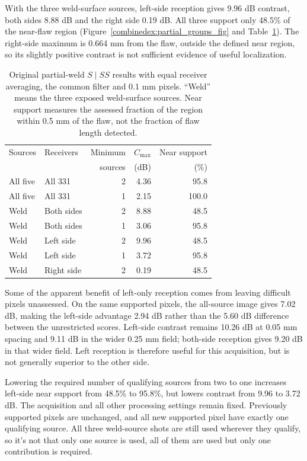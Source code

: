 With the three weld-surface sources, left-side reception gives 9.96 dB contrast, both sides 8.88 dB and the right side 0.19 dB. All three support only 48.5\% of the near-flaw region (Figure~\ref{combinedex:partial_groups_fig} and Table~\ref{combinedex:partial_groups}). The right-side maximum is 0.664 mm from the flaw, outside the defined near region, so its slightly positive contrast is not sufficient evidence of useful localization.

\begin{table}[!htbp]\centering\small
\caption{Original partial-weld $S\mid SS$ results with equal receiver averaging, the common filter and 0.1 mm pixels. ``Weld'' means the three exposed weld-surface sources. Near support measures the assessed fraction of the region within 0.5 mm of the flaw, not the fraction of flaw length detected.}
\label{combinedex:partial_groups}
\begin{tabularx}{\linewidth}{@{}XXrrr@{}}\toprule
Sources & Receivers & Minimum & $C_{\max}$ & Near support\\
 & & sources & (dB) & (\%)\\\midrule
All five & All 331 & 2 & 4.36 & 95.8\\
All five & All 331 & 1 & 2.15 & 100.0\\
Weld & Both sides & 2 & 8.88 & 48.5\\
Weld & Both sides & 1 & 3.06 & 95.8\\
Weld & Left side & 2 & 9.96 & 48.5\\
Weld & Left side & 1 & 3.72 & 95.8\\
Weld & Right side & 2 & 0.19 & 48.5\\
\bottomrule\end{tabularx}
\end{table}

Some of the apparent benefit of left-only reception comes from leaving difficult pixels unassessed. On the same supported pixels, the all-source image gives 7.02 dB, making the left-side advantage 2.94 dB rather than the 5.60 dB difference between the unrestricted scores. Left-side contrast remains 10.26 dB at 0.05 mm spacing and 9.11 dB in the wider 0.25 mm field; both-side reception gives 9.20 dB in that wider field. Left reception is therefore useful for this acquisition, but is not generally superior to the other side.

Lowering the required number of qualifying sources from two to one increases left-side near support from 48.5\% to 95.8\%, but lowers contrast from 9.96 to 3.72 dB. The acquisition and all other processing settings remain fixed. Previously supported pixels are unchanged, and all new supported pixel have exactly one qualifying source. All three weld-source shots are still used wherever they qualify, so it's not that only one source is used, all of them are used but only one contribution is required.

